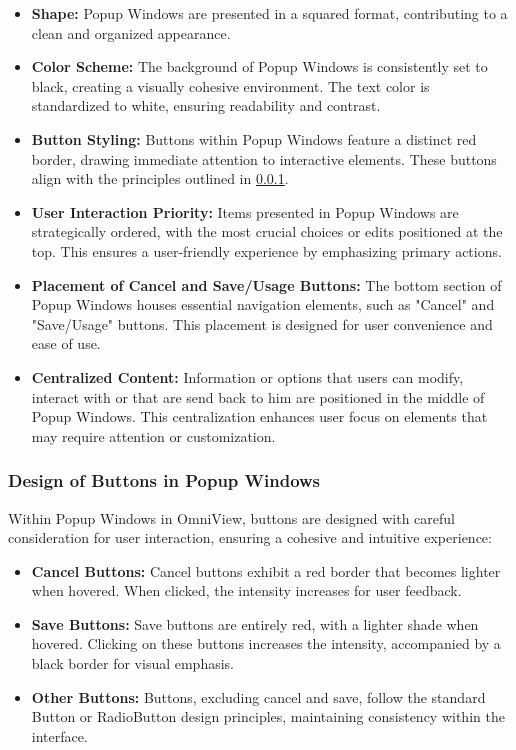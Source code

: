 \documentclass{scrreprt}
\begin{document}
\begin{itemize}
    \item \textbf{Shape:} Popup Windows are presented in a squared format, contributing to a clean and organized appearance.
    
    \item \textbf{Color Scheme:} The background of Popup Windows is consistently set to black, creating a visually cohesive environment. The text color is standardized to white, ensuring readability and contrast.
    
    \item \textbf{Button Styling:} Buttons within Popup Windows feature a distinct red border, drawing immediate attention to interactive elements. These buttons align with the principles outlined in \ref{cap:Designprinciples_PopupWindowButtons}.
    
    \item \textbf{User Interaction Priority:} Items presented in Popup Windows are strategically ordered, with the most crucial choices or edits positioned at the top. This ensures a user-friendly experience by emphasizing primary actions.
    
    \item \textbf{Placement of Cancel and Save/Usage Buttons:} The bottom section of Popup Windows houses essential navigation elements, such as "Cancel" and "Save/Usage" buttons. This placement is designed for user convenience and ease of use.
    
    \item \textbf{Centralized Content:} Information or options that users can modify, interact with or that are send back to him are positioned in the middle of Popup Windows. This centralization enhances user focus on elements that may require attention or customization.
\end{itemize}

\subsubsection{Design of Buttons in Popup Windows}\label{cap:Designprinciples_PopupWindowButtons}

Within Popup Windows in OmniView, buttons are designed with careful consideration for user interaction, ensuring a cohesive and intuitive experience:

\begin{itemize}
    \item \textbf{Cancel Buttons:} Cancel buttons exhibit a red border that becomes lighter when hovered. When clicked, the intensity increases for user feedback.
    
    \item \textbf{Save Buttons:} Save buttons are entirely red, with a lighter shade when hovered. Clicking on these buttons increases the intensity, accompanied by a black border for visual emphasis.
    
    \item \textbf{Other Buttons:} Buttons, excluding cancel and save, follow the standard Button or RadioButton design principles, maintaining consistency within the interface.
\end{itemize}
\end{document}

